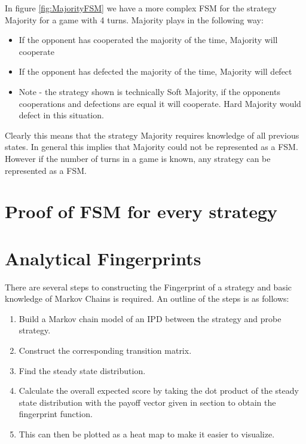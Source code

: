 In figure \ref{fig:MajorityFSM} we have a more complex FSM for the strategy Majority for a game with 4 turns.
Majority plays in the following way:

\begin{itemize}
  \item If the opponent has cooperated the majority of the time, Majority will cooperate
  \item If the opponent has defected the majority of the time, Majority will defect
  \item Note - the strategy shown is technically Soft Majority, if the opponents cooperations and defections are equal it will cooperate. Hard Majority would defect in this situation.
\end{itemize}

Clearly this means that the strategy Majority requires knowledge of all previous states.
In general this implies that Majority could not be represented as a FSM.
However if the number of turns in a game is known, any strategy can be represented as a FSM.

\section{Proof of FSM for every strategy}\label{sec:fsm_proof}


\section{Analytical Fingerprints}\label{sec:analytical-fingerprints}
There are several steps to constructing the Fingerprint of a strategy and basic knowledge of Markov Chains is required.
An outline of the steps is as follows:

\begin{enumerate}
    \item Build a Markov chain model of an IPD between the strategy and probe strategy.
    \item Construct the corresponding transition matrix.
    \item Find the steady state distribution.
    \item Calculate the overall expected score by taking the dot product of the steady state distribution with the payoff vector given in section to obtain the fingerprint function.
    \item This can then be plotted as a heat map to make it easier to visualize.
\end{enumerate}

